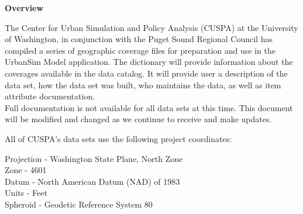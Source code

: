 

{\bf \large Overview}

The Center for Urban Simulation and Policy Analysis (CUSPA) at the
University of Washington, in conjunction with the Puget Sound
Regional Council has compiled a series of geographic coverage
files for preparation and use in the UrbanSim Model application.
The dictionary will provide information about the coverages
available in the data catalog. It will provide user a description
of the data set, how the data set was built, who maintains the
data, as well as item attribute documentation.\\

Full documentation is not available for all data sets at this
time. This document will be modified and changed as we continue to
receive and make updates.

All of CUSPA's data sets use the following project coordinates:

Projection - Washington State Plane, North Zone\\
Zone - 4601\\
Datum - North American Datum (NAD) of 1983\\
Units - Feet\\
Spheroid - Geodetic Reference System 80\\
